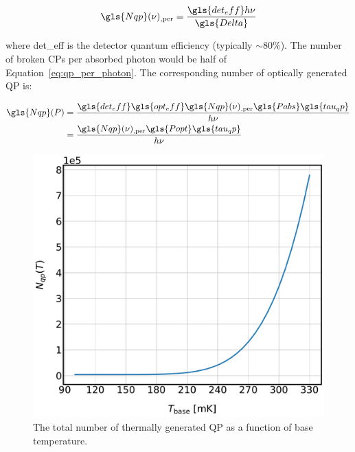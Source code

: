 \begin{equation}\label{eq:qp_per_photon}
  \gls{Nqp}(\nu)_{\mathrm{,per}} = \frac{\gls{det_eff} h\nu}{\gls{Delta}}
\end{equation}

where \gls{det_eff} is the detector quantum efficiency (typically $\sim$80\%). The number of broken CPs per absorbed photon would be half of Equation~\ref{eq:qp_per_photon}. The corresponding number of optically generated QP is:

\begin{equation}\label{eq:Nqp_P}
  \begin{aligned}
  \gls{Nqp}(P) &= \frac{ \gls{det_eff}\gls{opt_eff} \gls{Nqp}(\nu)_{\mathrm{,per}} \gls{Pabs}\gls{tau_qp}}{h\nu} \\
              &= \frac{\gls{Nqp}(\nu)_{\mathrm{,per}}\gls{Popt}\gls{tau_qp}}{h\nu}
  \end{aligned}
\end{equation}

\begin{figure}[!htbp]
\centering
\includegraphics[width=\textwidth]{figures/kid_model/Nqp_T}
\caption[ as a function of base temperature.]{The total number of thermally generated QP as a function of base temperature.}
\label{fig:Nqp_T}
\end{figure}

